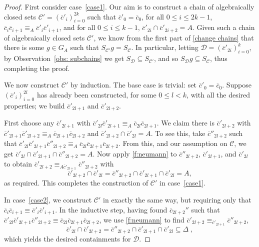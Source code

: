 \documentclass[10pt,a4paper]{amsart}
\newcommand{\nn}[0]{S}
\newcommand{\C}[0]{\mathcal{C}}
\newcommand{\D}[0]{\mathcal{D}}
\renewcommand\leq{\leqslant}
\theoremstyle{plain}
\theoremstyle{remark}
\begin{document}
\begin{proof}
{First consider case~\ref{case1}. 
Our aim is to construct a chain of algebraically closed sets
$\C'=(\overline{c}'_{i})_{i=0}^{2k}$ such that 
$\overline{c}'_{0}=\overline{c}_{0}$, 
for all $0\leq i\leq 2k-1$, $\overline{c}_{i}\overline{c}_{i+1}
\equiv_{A}
\overline{c}'_{i}\overline{c}'_{i+1}$, and for all $0\leq i\leq k-1$,
$\overline{c}'_{2i}\cap\overline{c}'_{2i+2}=A$.
Given such a chain of algebraically closed sets $\C'$, we know from the first
part of \cref{change chains} that there is some $g\in G_{A}$ such that $\nn_{\C'}g=
\nn_{\C}$. In particular, letting $\D=(\overline{c}'_{2i})_{i=0}^{k}$, by
Observation~\ref{obs: subchains} we get $\nn_\D\subseteq\nn_{\C'}$, and so $\nn_\D g\subseteq \nn_{\C}$, thus completing the proof.}

{We now construct $\mathcal{C}'$ by induction. The base case is trivial: set $\overline{c}'_{0}=\overline{c}_{0}$. Suppose $(\overline{c}'_{i})_{i=0}^{2l}$ has already been constructed, for some $0\leq l<k$, with all the desired properties; we build $\overline{c}'_{2l+1}$ and $\overline{c}'_{2l+2}$.}

{First choose any $\overline{c}'_{2l+1}$ with $\overline{c}'_{2l}\overline{c}'_{2l+1}
\equiv_{A}
\overline{c}_{2l}\overline{c}_{2l+1}$. We claim there is $\overline{c}'_{2l+2}$ with $\overline{c}'_{2l+1}\overline{c}'_{2l+2}
\equiv_{A}
\overline{c}_{2l+1}\overline{c}_{2l+2}$
and
$\overline{c}'_{2l+2}\cap \overline{c}'_{2l}=A$. To see this, take $\overline{c}''_{2l+2}$ such that $\overline{c}'_{2l}\overline{c}'_{2l+1}
\overline{c}''_{2l+2}
\equiv_A
\overline{c}_{2l}\overline{c}_{2l+1}\overline{c}_{2l+2}$.
From this, and our assumption on $\C$, we get $\overline{c}'_{2l}\cap\overline{c}'_{2l+1}
\cap\overline{c}''_{2l+2}=A$. 
Now apply \cref{f:neumann} to
$\overline{c}''_{2l+2}$,
$\overline{c}'_{2l+1}$, and
$\overline{c}'_{2l}$ to obtain 
$\overline{c}'_{2l+2}\equiv_{A \overline{c}'_{2l+1}}
\overline{c}''_{2l+2}$ with}
\[
\overline{c}'_{2l+2}\cap \overline{c}'_{2l}
=
\overline{c}''_{2l+2}\cap
\overline{c}'_{2l+1}\cap
\overline{c}'_{2l}
=A,
\]
{as required. This completes the construction of $\C'$ in case~\ref{case1}.}

{In case~\ref{case2}, we construct $\C'$ in exactly the same way, but
requiring only that $\overline{c}_{i}\overline{c}_{i+1}
\equiv
\overline{c}'_{i}\overline{c}'_{i+1}$. In the inductive step, having found $\overline{c}_{2l+2}''$ such that $\overline{c}'_{2l}\overline{c}'_{2l+1}
\overline{c}''_{2l+2}
\equiv
\overline{c}_{2l}\overline{c}_{2l+1}\overline{c}_{2l+2}$, we use \cref{f:neumann} to
find $\overline{c}'_{2l+2}\equiv_{\overline{c}'_{2l+1}}
\overline{c}''_{2l+2}$,}
\[
\overline{c}'_{2l}\cap\overline{c}'_{2l+2}=\overline{c}''_{2l+2}\cap
\overline{c}'_{2l+1}\cap
\overline{c}'_{2l}\subseteq\Delta\;,
\]
{which yields the desired containments for $\D$.}
\end{proof}
\end{document}
